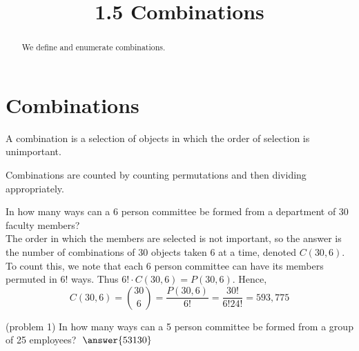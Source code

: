 \documentclass[handout]{ximera}
\title{1.5 Combinations}
\begin{document}
\begin{abstract}
We define and enumerate combinations.
\end{abstract}

\maketitle

\section{Combinations}



\begin{definition}[Combination]
A combination is a selection of objects in which the order of selection is unimportant.
\end{definition}

Combinations are counted by counting permutations and then dividing appropriately.


\begin{example}[example 1]
In how many ways can a 6 person committee be formed from a department of 30 faculty members?\\
The order in which the members are selected is not important, so the answer is the number of combinations of 30 objects taken 6 at a time, denoted $C(30,6)$.  To count this, we note that each 6 person committee can have its members permuted in $6!$ ways. Thus $6! \cdot C(30,6) = P(30,6)$.  Hence,
\[
C(30,6) = \binom{30}{6} = \frac{P(30,6)}{6!} = \frac{30!}{6!24!} = 593,775
\]
\end{example}

\begin{problem}(problem 1)
In how many ways can a 5 person committee be formed from a group of 25 employees? $\; \answer{53130}$\\
\end{problem}
\end{document}
